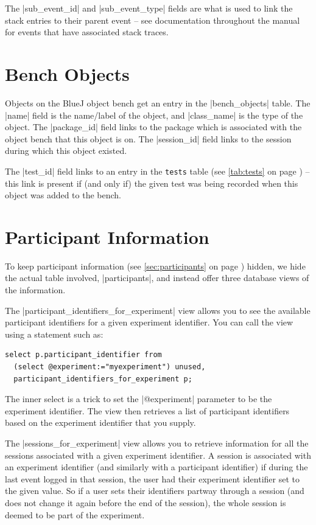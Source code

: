 \documentclass{report}
\newcommand{\myref}[1]{\autoref{#1} on page \pageref*{#1}}
\newcommand{\tabref}[1]{\lstinline|#1| table (see \myref{tab:#1})}
\begin{document}
The |sub_event_id| and |sub_event_type| fields are what is used to
link the stack entries to their parent event -- see documentation
throughout the manual for events that have associated stack traces.
\section{Bench Objects}


Objects on the BlueJ object bench get an entry in the |bench_objects|
table.  The |name| field is the name/label of the object, and
|class_name| is the type of the object.  The |package_id| field links
to the package which is associated with the object bench that this
object is on.  The |session_id| field links to the session during
which this object existed.

The |test_id| field links to an entry in the \tabref{tests} -- this
link is present if (and only if) the given test was being recorded
when this object was added to the bench.

\section{Participant Information}
\label{sec:views}

To keep participant information (see \myref{sec:participants}) hidden,
we hide the actual table involved, |participants|, and instead offer three
database views of the information.


The |participant_identifiers_for_experiment| view allows you to see the
available participant identifiers for a given experiment identifier.  You can
call the view using a statement such as:

\begin{lstlisting}
select p.participant_identifier from
  (select @experiment:="myexperiment") unused,
  participant_identifiers_for_experiment p;
\end{lstlisting}

The inner select is a trick to set the |@experiment| parameter to be the
experiment identifier.  The view then retrieves a list of participant
identifiers based on the experiment identifier that you supply.



The |sessions_for_experiment| view allows you to retrieve information for all
the sessions associated with a given experiment identifier.  A session is
associated with an experiment identifier (and similarly with a participant
identifier) if during the last event logged in that session, the user had
their experiment identifier set to the given value.  So if a user sets their
identifiers partway through a session (and does not change it again before the
end of the session), the whole session is deemed to be part of the experiment.
\end{document}
